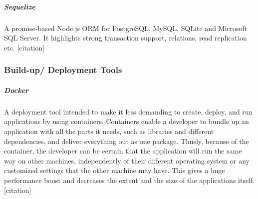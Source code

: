 \subparagraph{Sequelize}
A promise-based Node.js ORM for PostgreSQL, MySQL, SQLite and Microsoft SQL Server. It highlights strong transaction support, relations, read replication etc. [citation]


\subsubsection{Build-up/ Deployment Tools}
\subparagraph{Docker}
A deployment tool intended to make it less demanding to create, deploy, and run applications by using containers. Containers enable a developer to bundle up an application with all the parts it needs, such as libraries and different dependencies, and deliver everything out as one package. Thusly, because of the container, the developer can be certain that the application will run the same way on other machines, independently of their different operating system or any customized settings that the other machine may have. This gives a huge performance boost and decreases the extent and the size of the applications itself. [citation]
